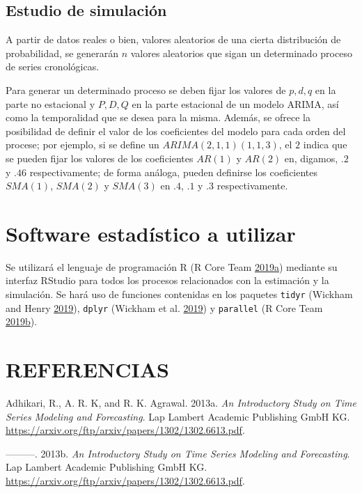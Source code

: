 \documentclass[]{article}
\begin{document}
\subsection{Estudio de simulación}

A partir de datos reales o bien, valores aleatorios de una cierta
distribución de probabilidad, se generarán \(n\) valores aleatorios que
sigan un determinado proceso de series cronológicas.

Para generar un determinado proceso se deben fijar los valores de
\(p,d,q\) en la parte no estacional y \(P,D,Q\) en la parte estacional
de un modelo ARIMA, así como la temporalidad que se desea para la misma.
Además, se ofrece la posibilidad de definir el valor de los coeficientes
del modelo para cada orden del procese; por ejemplo, si se define un
\(ARIMA(2,1,1)(1,1,3)\), el \(2\) indica que se pueden fijar los valores
de los coeficientes \(AR(1)\) y \(AR(2)\) en, digamos, \(.2\) y \(.46\)
respectivamente; de forma análoga, pueden definirse los coeficientes
\(SMA(1)\), \(SMA(2)\) y \(SMA(3)\) en \(.4\), \(.1\) y \(.3\)
respectivamente.

\section{Software estadístico a utilizar}

Se utilizará el lenguaje de programación R (R Core Team
\protect\hyperlink{ref-Rbase}{2019}\protect\hyperlink{ref-Rbase}{a})
mediante su interfaz RStudio para todos los procesos relacionados con la
estimación y la simulación. Se hará uso de funciones contenidas en los
paquetes \texttt{tidyr} (Wickham and Henry
\protect\hyperlink{ref-tidyr}{2019}), \texttt{dplyr} (Wickham et al.
\protect\hyperlink{ref-dplyr}{2019}) y \texttt{parallel} (R Core Team
\protect\hyperlink{ref-parallel}{2019}\protect\hyperlink{ref-parallel}{b}).

\section{REFERENCIAS}

\hypertarget{refs}{}
\leavevmode\hypertarget{ref-diferenciacion}{}%
Adhikari, R., A. R. K, and R. K. Agrawal. 2013a. \emph{An Introductory
Study on Time Series Modeling and Forecasting}. Lap Lambert Academic
Publishing GmbH KG.
\url{https://arxiv.org/ftp/arxiv/papers/1302/1302.6613.pdf}.

\leavevmode\hypertarget{ref-medidas}{}%
---------. 2013b. \emph{An Introductory Study on Time Series Modeling
and Forecasting}. Lap Lambert Academic Publishing GmbH KG.
\url{https://arxiv.org/ftp/arxiv/papers/1302/1302.6613.pdf}.
\end{document}

